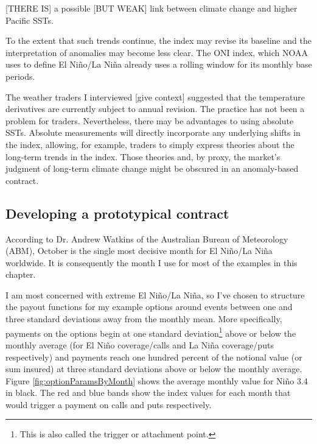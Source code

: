 \documentclass[authoryear]{article}
\begin{document}
[THERE IS] a possible [BUT WEAK] link between climate change and higher Pacific SSTs. 

To the extent that such trends continue, the index may revise its baseline and the interpretation of anomalies may become less clear. The ONI index, which NOAA uses to define El Ni\~no/La Ni\~na already uses a rolling window for its monthly base periods.

The weather traders I interviewed [give context] suggested that the temperature derivatives are currently subject to annual revision. The practice has not been a problem for traders. Nevertheless, there may be advantages to using absolute SSTs. Absolute measurements will directly incorporate any underlying shifts in the index, allowing, for example, traders to simply express theories about the long-term trends in the index. Those theories and, by proxy, the market's judgment of long-term climate change might be obscured in an anomaly-based contract.

\subsection{Developing a prototypical contract}
According to Dr. Andrew Watkins of the Australian Bureau of Meteorology (ABM), October is the single most decisive month for El Ni\~no/La Ni\~na worldwide. It is consequently the month I use for most of the examples in this chapter.


I am most concerned with extreme El Ni\~no/La Ni\~na, so I've chosen to structure the payout functions for my example options around events between one and three standard deviations away from the monthly mean. More specifically, payments on the options begin at one standard deviation\footnote{This is also called the trigger or attachment point.} above or below the monthly average (for El Ni\~no coverage/calls and La Ni\~na coverage/puts respectively) and payments reach one hundred percent of the notional value (or sum insured) at three standard deviations above or below the monthly average. Figure \ref{fig:optionParamsByMonth} shows the average monthly value for Ni\~no 3.4 in black. The red and blue bands show the index values for each month that would trigger a payment on calls and puts respectively. 
\end{document}
